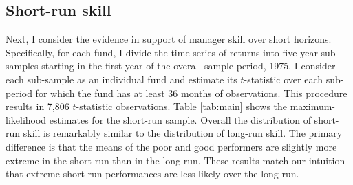 \subsection{Short-run skill}
Next, I consider the evidence in support of manager skill over short horizons.  Specifically, for each fund, I divide the time series of returns into five year sub-samples starting in the first year of the overall sample period, 1975.  I consider each sub-sample as an individual fund and estimate its $t$-statistic over each sub-period for which the fund has at least 36 months of observations.  This procedure results in 7,806 $t$-statistic observations.  Table \ref{tab:main} shows the maximum-likelihood estimates for the short-run sample.  Overall the distribution of short-run skill is remarkably similar to the distribution of long-run skill.  The primary difference is that the means of the poor and good performers are slightly more extreme in the short-run than in the long-run.  These results match our intuition that extreme short-run performances are less likely over the long-run.

